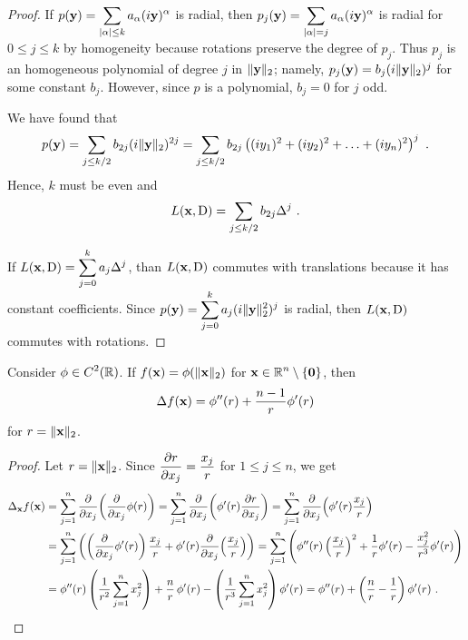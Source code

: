 \begin{proof}
If $\displaystyle p(\mathbf{y}) = \sum_{|\alpha|\leq k} a_{\alpha} (i\mathbf{y})^\alpha$
is radial, then $\displaystyle
p_j(\mathbf{y}) = \sum_{|\alpha|=j} a_{\alpha} (i\mathbf{y})^\alpha$ is
radial for $0\leq j \leq k$ by homogeneity because rotations preserve the
degree of $p_j$.  Thus $p_j$ is an homogeneous polynomial of degree
$j$ in $\displaystyle \|\mathbf{y}\|_2$;
namely, $p_j(\mathbf{y}) = b_j (i\|\mathbf{y}\|_2)^j$ for some constant $b_j$.
However, since $p$ is a polynomial, $b_j=0$ for $j$ odd.

We have found that
\[
p(\mathbf{y}) = \sum_{j\leq k/2} b_{2j} (i\|\mathbf{y}\|_2)^{2j}
= \sum_{j\leq k/2} b_{2j} \left( (i y_1)^2 + (iy_2)^2
+ \ldots +(iy_n)^2 \right)^j \ .
\]
Hence, $k$ must be even and
\[
L(\mathbf{x},\operatorname{D}) = \sum_{j\leq k/2} b_{2j} \Delta^j \ .
\]

\stage{$\Leftarrow$}
If $\displaystyle L(\mathbf{x},\operatorname{D}) = \sum_{j=0}^k a_j \Delta^j$, than
$L(\mathbf{x},\operatorname{D})$ commutes with translations because it has constant
coefficients.
Since $\displaystyle p(\mathbf{y}) = \sum_{j=0}^k a_j (i \|\mathbf{y}\|_2^2)^j$ 
is radial, then $L(\mathbf{x},\operatorname{D})$ commutes with rotations.
\end{proof}

\begin{prop} \label{laplace_spheric}
Consider $\displaystyle \phi \in C^2(\mathbb{R})$.
If $f(\mathbf{x}) = \phi(\|\mathbf{x}\|_2)$ for
$\displaystyle \mathbf{x}\in \mathbb{R}^n\setminus \{\mathbf{0}\}$, then
\[
\Delta f(\mathbf{x}) = \phi''(r) + \frac{n-1}{r} \phi'(r)
\]
for $r = \|\mathbf{x}\|_2$.
\end{prop}

\begin{proof}
Let $r = \|\mathbf{x}\|_2$.  Since
$\displaystyle \frac{\partial{r}}{\partial x_j} = \frac{x_j}{r}$ for $1 \leq j \leq n$, we get
\begin{align*}
\Delta_{\VEC{x}} f(\VEC{x})
&= \sum_{j=1}^n \pdfdx{\left(\pdfdx{\phi(r)}{x_j}\right)}{x_j}
= \sum_{j=1}^n \pdfdx{\left(\phi'(r)\pdydx{r}{x_j}\right)}{x_j}
= \sum_{j=1}^n \pdfdx{\left(\phi'(r) \frac{x_j}{r} \right)}{x_j} \\
&= \sum_{j=1}^n \left( \left(\pdfdx{\phi'(r)}{x_j}\right) \frac{x_j}{r}
+ \phi'(r) \pdfdx{\left(\frac{x_j}{r}\right)}{x_j}\right)
= \sum_{j=1}^n \left(
\phi''(r) \left(\frac{x_j}{r}\right)^2 + \frac{1}{r} \phi'(r) -
\frac{x_j^2}{r^3}\phi'(r) \right) \\
&= \phi''(r)\left( \frac{1}{r^2}\sum_{j=1}^n x_j^2\right)
+ \frac{n}{r}\, \phi'(r) - \left(\frac{1}{r^3}\sum_{j=1}^n x_j^2\right) \phi'(r)
= \phi''(r) + \left(\frac{n}{r} - \frac{1}{r}\right) \phi'(r) \ .  \qedhere
\end{align*}
\end{proof}

